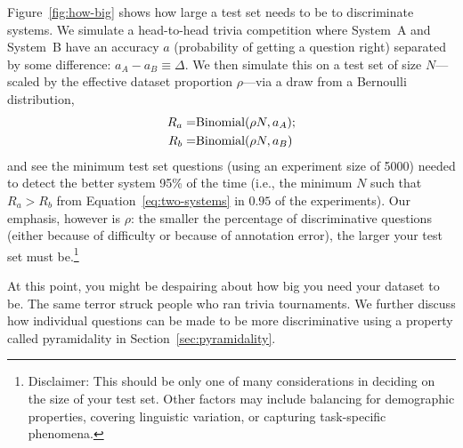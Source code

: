 Figure~\ref{fig:how-big} shows how large a test set needs to be to discriminate systems. 
We simulate a head-to-head trivia competition where System~A and System~B have an accuracy $a$ (probability of getting a question right) separated by some difference: $a_A - a_B \equiv \Delta$.
We then simulate this on a test set of size $N$---scaled by the effective dataset proportion $\rho$---via a draw from a Bernoulli distribution,
\begin{align}
    R_a = & \mbox{Binomial}(\rho N, a_A); \notag \\
    R_b = & \mbox{Binomial}(\rho N, a_B)
    \label{eq:two-systems}
\end{align}
and see the minimum test set questions (using an experiment size of 5000) needed to detect the better system 95\% of the time (i.e., the minimum $N$ such that $R_a > R_b$ from Equation~\ref{eq:two-systems} in $0.95$ of the experiments).
Our emphasis, however is $\rho$: the smaller the percentage of discriminative questions (either because of difficulty or because of annotation error), the larger your test set must be.\footnote{Disclaimer: This should be only one of many considerations in deciding on the size of your test set.  Other factors may include balancing for demographic properties, covering linguistic variation, or capturing task-specific phenomena.}

At this point, you might be despairing about how big you need your dataset to be.
The same terror struck people who ran trivia tournaments.
We further discuss how individual questions can be made to be more discriminative using a property called pyramidality in Section~\ref{sec:pyramidality}.

